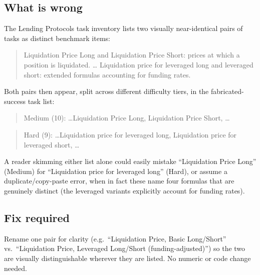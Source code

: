 \documentclass[11pt]{article}
\newenvironment{evidence}
  {\begin{quote}\small\ttfamily}
  {\end{quote}}
\begin{document}
\subsection*{What is wrong}
The Lending Protocols task inventory lists two visually near-identical
pairs of tasks as distinct benchmark items:
\begin{evidence}
Liquidation Price Long and Liquidation Price Short: prices at which a
position is liquidated.
\ldots
Liquidation price for leveraged long and leveraged short: extended formulas
accounting for funding rates.
\end{evidence}
Both pairs then appear, split across different difficulty tiers, in the
fabricated-success task list:
\begin{evidence}
Medium (10): \ldots Liquidation Price Long, Liquidation Price Short, \ldots
\end{evidence}
\begin{evidence}
Hard (9): \ldots Liquidation price for leveraged long, Liquidation price
for leveraged short, \ldots
\end{evidence}
A reader skimming either list alone could easily mistake ``Liquidation
Price Long'' (Medium) for ``Liquidation price for leveraged long'' (Hard),
or assume a duplicate/copy-paste error, when in fact these name four
formulas that are genuinely distinct (the leveraged variants explicitly
account for funding rates).

\subsection*{Fix required}
Rename one pair for clarity (e.g.\ ``Liquidation Price, Basic Long/Short''
vs.\ ``Liquidation Price, Leveraged Long/Short (funding-adjusted)'') so the
two are visually distinguishable wherever they are listed. No numeric or
code change needed.

\clearpage
\end{document}
